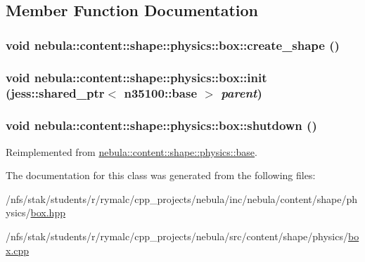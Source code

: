 \subsection{Member Function Documentation}
\hypertarget{classnebula_1_1content_1_1shape_1_1physics_1_1box_ae09f21744de13654524989b9b4c4408e}{
\subsubsection[{create\_\-shape}]{\setlength{\rightskip}{0pt plus 5cm}void nebula::content::shape::physics::box::create\_\-shape ()}}
\label{classnebula_1_1content_1_1shape_1_1physics_1_1box_ae09f21744de13654524989b9b4c4408e}
\hypertarget{classnebula_1_1content_1_1shape_1_1physics_1_1box_ae2378ed04f339cdb0874a9a680a44576}{
\subsubsection[{init}]{\setlength{\rightskip}{0pt plus 5cm}void nebula::content::shape::physics::box::init (jess::shared\_\-ptr$<$ {\bf n35100::base} $>$ {\em parent})}}
\label{classnebula_1_1content_1_1shape_1_1physics_1_1box_ae2378ed04f339cdb0874a9a680a44576}
\hypertarget{classnebula_1_1content_1_1shape_1_1physics_1_1box_a798aaaef8d3f5535e3aea4eabf19924c}{
\subsubsection[{shutdown}]{\setlength{\rightskip}{0pt plus 5cm}void nebula::content::shape::physics::box::shutdown ()}}
\label{classnebula_1_1content_1_1shape_1_1physics_1_1box_a798aaaef8d3f5535e3aea4eabf19924c}


Reimplemented from \hyperlink{classnebula_1_1content_1_1shape_1_1physics_1_1base_a78d06b0deed793d88b08baeb60f18665}{nebula::content::shape::physics::base}.

The documentation for this class was generated from the following files:\begin{DoxyCompactItemize}
\item 
/nfs/stak/students/r/rymalc/cpp\_\-projects/nebula/inc/nebula/content/shape/physics/\hyperlink{physics_2box_8hpp}{box.hpp}\item 
/nfs/stak/students/r/rymalc/cpp\_\-projects/nebula/src/content/shape/physics/\hyperlink{physics_2box_8cpp}{box.cpp}\end{DoxyCompactItemize}
